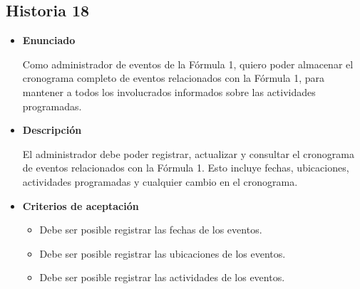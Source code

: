 \documentclass{article}
\begin{document}
	\subsection{Historia 18}
	\begin{itemize}
		
		\item \large{\textbf{Enunciado}}
		\begin{description}
			Como administrador de eventos de la Fórmula 1, quiero poder almacenar el cronograma completo de eventos relacionados con la Fórmula 1, para mantener a todos los involucrados informados sobre las actividades programadas.
			
		\end{description}
		
		\item \large{\textbf{Descripción}}
		\begin{description}
			El administrador debe poder registrar, actualizar y consultar el cronograma de eventos relacionados con la Fórmula 1. Esto incluye fechas, ubicaciones, actividades programadas y cualquier cambio en el cronograma.
			
		\end{description}
		
		\item \large{\textbf{Criterios de aceptación}}
		\begin{itemize}
			\item Debe ser posible registrar las fechas de los eventos.
			\item Debe ser posible registrar las ubicaciones de los eventos.
			\item Debe ser posible registrar las actividades de los eventos.
			
		\end{itemize}
		
	\end{itemize}
	
\end{document}
